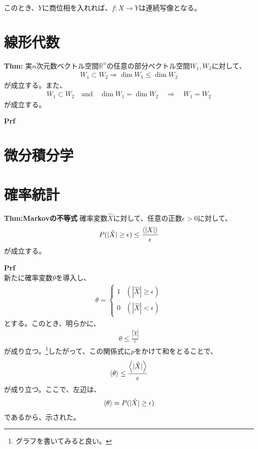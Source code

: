 \documentclass[a4paper,11pt]{jsarticle}
\numberwithin{equation}{section}
\begin{document}
このとき、$Y$に商位相を入れれば、$f:X \to Y$は連続写像となる。\\

\section{線形代数}

\begin{itembox}[l]{\textbf{Thm:}}
  実$n$次元数ベクトル空間$\mathbb{R}^n$の任意の部分ベクトル空間$W_1, W_2$に対して、
  \begin{align}
    W_1 \subset W_2 \Rightarrow \dim W_1 \leq \dim W_2
  \end{align}
  が成立する。また、
  \begin{align}
    W_1 \subset W_2 \quad \text{and} \quad \dim W_1 = \dim W_2 \quad \Rightarrow \quad W_1 = W_2
  \end{align}
  が成立する。
\end{itembox}
\textbf{Prf}\\

\section{微分積分学}

\section{確率統計}
\begin{itembox}[l]{\textbf{Thm:Markovの不等式}}
  確率変数$\hat{X}$に対して、任意の正数$\epsilon > 0$に対して、
  \begin{align}
    P(|\hat{X} | \geq \epsilon) \leq \frac{\expval{|X|}}{\epsilon}
  \end{align}
  が成立する。

\end{itembox}
\textbf{Prf}\\
新たに確率変数$\theta$を導入し、
\begin{align}
  \theta = \begin{cases}
    1 & (|\hat{X}| \geq \epsilon)\\
    0 & (|\hat{X}| < \epsilon)
  \end{cases}
\end{align}
とする。このとき、明らかに、
\begin{align}
  \theta \leq \frac{|\hat{X}|}{\epsilon}
\end{align}
が成り立つ。\footnote{グラフを書いてみると良い。}したがって、この関係式に$p$をかけて和をとることで、
\begin{align}
  \ev{\theta} \leq \frac{\expval{|\hat{X}|}}{\epsilon}
\end{align}
が成り立つ。ここで、左辺は、
\begin{align}
  \ev{\theta} = P(|\hat{X} | \geq \epsilon)
\end{align}
であるから、示された。\hfill\qedsymbol\\
\end{document}
